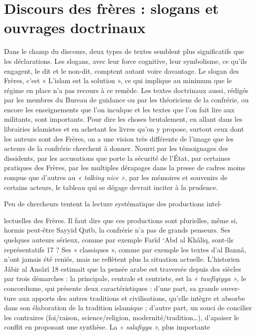 \hypertarget{discours-des-fruxe8res-slogans-et-ouvrages-doctrinaux}{%
\section{Discours des frères : slogans et ouvrages
doctrinaux}\label{discours-des-fruxe8res-slogans-et-ouvrages-doctrinaux}}

Dans le champ du discours, deux types de textes semblent plus
significatifs que les déclarations. Les slogans, avec leur force
cognitive, leur symbolisme, ce qu'ils engagent, le dit et le non-dit,
comptent autant voire davantage. Le slogan des Frères, c'est « L'islam
est la solution », ce qui implique au minimum que le régime en place n'a
pas recours à ce remède. Les textes doctrinaux aussi, rédigés par les
membres du Bureau de guidance ou par les théoriciens de la confrérie, ou
encore les enseignements que l'on inculque et les textes que l'on fait
lire aux militants, sont importants. Pour dire les choses brutalement,
en allant dans les librairies islamistes et en achetant les livres qu'on
y propose, surtout ceux dont les auteurs sont des Frères, on a une
vision très différente de l'image que les acteurs de la confrérie
cherchent à donner. Nourri par les témoignages des dissidents, par les
accusations que porte la sécurité de l'État, par certaines pratiques des
Frères, par les multiples dérapages dans la presse de cadres moins
rompus que d'autres au \emph{« talking nice »}, par les mémoires et
souvenirs de certains acteurs, le tableau qui se dégage devrait inciter
à la prudence.

Peu de chercheurs tentent la lecture systématique des productions intel-

lectuelles des Frères. Il faut dire que ces productions sont plurielles,
même si, hormis peut-être Sayyid Qutb, la confrérie n'a pas de grands
penseurs. Ses quelques auteurs sérieux, comme par exemple Farîd `Abd al
Khâliq, sont-ils représentatifs 17 ? Ses « classiques », comme par
exemple les textes d'al Bannâ, n'ont jamais été reniés, mais ne
reflètent plus la situation actuelle. L'historien Jâbir al Ansârî 18
estimait que la pensée arabe est traversée depuis des siècles par trois
démarches : la principale, centrale et centriste, est la \emph{«
tawfîqiyya »}, le concordisme, qui présente deux caractéristiques :
d'une part, sa grande ouver- ture aux apports des autres traditions et
civilisations, qu'elle intègre et absorbe dans son élaboration de la
tradition islamique ; d'autre part, un souci de concilier les contraires
(foi/raison, science/religion, modernité/tradition\ldots), d'apaiser le
conflit en proposant une synthèse. La \emph{« salafiyya »,} plus
importante

